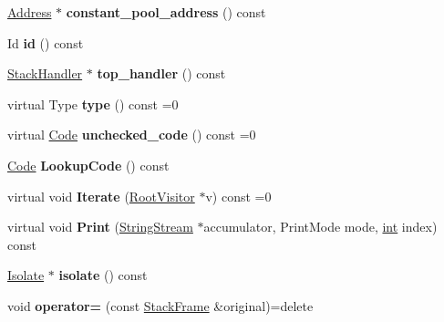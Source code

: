 \begin{DoxyCompactItemize}
\mbox{\hyperlink{classuintptr__t}{Address}} $\ast$ {\bfseries constant\+\_\+pool\+\_\+address} () const
\item 
\mbox{\label{classv8_1_1internal_1_1StackFrame_aab8e7b4048fade9eba3272651830f52f}} 
Id {\bfseries id} () const
\item 
\mbox{\label{classv8_1_1internal_1_1StackFrame_aa5d31ae1e2158e119c1575dc9bf31d07}} 
\mbox{\hyperlink{classv8_1_1internal_1_1StackHandler}{Stack\+Handler}} $\ast$ {\bfseries top\+\_\+handler} () const
\item 
\mbox{\label{classv8_1_1internal_1_1StackFrame_a88b5e0918e5090f576323df49a7dd57f}} 
virtual Type {\bfseries type} () const =0
\item 
\mbox{\label{classv8_1_1internal_1_1StackFrame_a1ae087b7ba1a8389196c2f8087df0521}} 
virtual \mbox{\hyperlink{classv8_1_1internal_1_1Code}{Code}} {\bfseries unchecked\+\_\+code} () const =0
\item 
\mbox{\label{classv8_1_1internal_1_1StackFrame_a0137f1ee59b5870bd5cb7d3fc7de1aed}} 
\mbox{\hyperlink{classv8_1_1internal_1_1Code}{Code}} {\bfseries Lookup\+Code} () const
\item 
\mbox{\label{classv8_1_1internal_1_1StackFrame_aab011a08317b22888974fe2ce8bffac3}} 
virtual void {\bfseries Iterate} (\mbox{\hyperlink{classv8_1_1internal_1_1RootVisitor}{Root\+Visitor}} $\ast$v) const =0
\item 
\mbox{\label{classv8_1_1internal_1_1StackFrame_addfdf12f9318c8969bf991991465dccb}} 
virtual void {\bfseries Print} (\mbox{\hyperlink{classv8_1_1internal_1_1StringStream}{String\+Stream}} $\ast$accumulator, Print\+Mode mode, \mbox{\hyperlink{classint}{int}} index) const
\item 
\mbox{\label{classv8_1_1internal_1_1StackFrame_aa833f02441454c45d09c5bf51a699a20}} 
\mbox{\hyperlink{classv8_1_1internal_1_1Isolate}{Isolate}} $\ast$ {\bfseries isolate} () const
\item 
\mbox{\label{classv8_1_1internal_1_1StackFrame_afc2d74826f291f14b6402b8839b98f1a}} 
void {\bfseries operator=} (const \mbox{\hyperlink{classv8_1_1internal_1_1StackFrame}{Stack\+Frame}} \&original)=delete
\end{DoxyCompactItemize}

